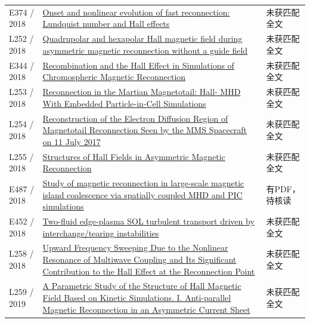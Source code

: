 \documentclass[UTF8,a4paper,11pt,openany,fontset=fandol]{ctexbook}
\begin{document}
\begin{longtable}{P{24mm}P{97mm}P{27mm}}
E374 / 2018 & \href{http://ui.adsabs.harvard.edu/abs/2018shin.confE.240S/abstract}{Onset and nonlinear evolution of fast reconnection: Lundquist number and Hall effects} & 未获匹配全文\\

L252 / 2018 & \href{https://doi.org/10.1063/1.5030439}{Quadrupolar and hexapolar Hall magnetic field during asymmetric magnetic reconnection without a guide field} & 未获匹配全文\\

E344 / 2018 & \href{http://ui.adsabs.harvard.edu/abs/2018shin.confE.188M/abstract}{Recombination and the Hall Effect in Simulations of Chromospheric Magnetic Reconnection} & 未获匹配全文\\

L253 / 2018 & \href{https://doi.org/10.1029/2017ja024729}{Reconnection in the Martian Magnetotail: Hall‐ MHD With Embedded Particle‐in‐Cell Simulations} & 未获匹配全文\\

L254 / 2018 & \href{https://doi.org/10.1029/2018ja026051}{Reconstruction of the Electron Diffusion Region of Magnetotail Reconnection Seen by the MMS Spacecraft on 11 July 2017} & 未获匹配全文\\

L255 / 2018 & \href{https://doi.org/10.1029/2018ja025251}{Structures of Hall Fields in Asymmetric Magnetic Reconnection} & 未获匹配全文\\

E487 / 2018 & \href{https://doi.org/10.1063/1.5037774}{Study of magnetic reconnection in large-scale magnetic island coalescence via spatially coupled MHD and PIC simulations} & 有PDF，待核读\\

E452 / 2018 & \href{https://meetings.aps.org/Meeting/DPP18/Session/CO5.1}{Two-fluid edge-plasma SOL turbulent transport driven by interchange/tearing instabilities} & 未获匹配全文\\

L258 / 2018 & \href{https://doi.org/10.1029/2018gl078614}{Upward Frequency Sweeping Due to the Nonlinear Resonance of Multiwave Coupling and Its Significant Contribution to the Hall Effect at the Reconnection Point} & 未获匹配全文\\

L259 / 2019 & \href{https://doi.org/10.3847/1538-4357/ab14ef}{A Parametric Study of the Structure of Hall Magnetic Field Based on Kinetic Simulations. I. Anti-parallel Magnetic Reconnection in an Asymmetric Current Sheet} & 未获匹配全文\\


\end{longtable}
\end{document}
